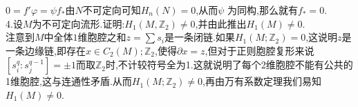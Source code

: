 \documentclass[b5paper]{ctexart}
\begin{document}
$0=f'\varphi=\psi f_*$由$N$不可定向可知$H_n(N)=0$,从而$\psi$
为同构,那么就有$f_*=0$.\\
4.设$M$为不可定向流形.证明:$H_1(M,\mathbb{Z}_2)\neq 0$,并由此推出$H_1(M)\neq 0$.\\
注意到$M$中全体$1$维胞腔之和$z=\sum s_i$是一条闭链.如果$H_1(M;\mathbb{Z}_2)=0$,这说明$z$是一条边缘链,即存在$x\in C_2(M);\mathbb{Z}_2$,使得$\partial x=z$,但对于正则胞腔复形来说$[s^q_i:s^{q-1}_j]=\pm 1$而取$\mathbb{Z}_2$时,不计较符号全为1.这就说明了每个2维胞腔不能有公共的1维胞腔,这与连通性矛盾.从而$H_1(M;\mathbb{Z}_2)\neq 0$,再由万有系数定理我们易知$H_1(M)\neq 0$.
\end{document}
